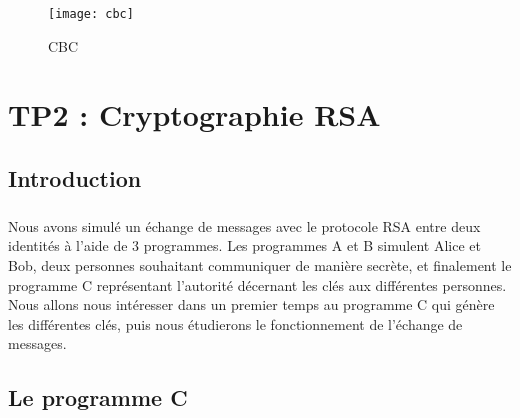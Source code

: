 \documentclass[11pt,fleqn]{book} %
\begin{document}
\begin{figure}[!h]
\centering\texttt{[image: cbc]}
\caption{CBC}
\end{figure}


\chapter{TP2 : Cryptographie RSA}


\section{Introduction}

\paragraph{}Nous avons simulé un échange de messages avec le protocole RSA entre deux identités à l'aide de 3 programmes. Les programmes A et B simulent Alice et Bob, deux personnes souhaitant communiquer de manière secrète, et finalement le programme C représentant l'autorité décernant les clés aux différentes personnes. Nous allons nous intéresser dans un premier temps au programme C qui génère les différentes clés, puis nous étudierons le fonctionnement de l'échange de messages.


\section{Le programme C}
\end{document}
